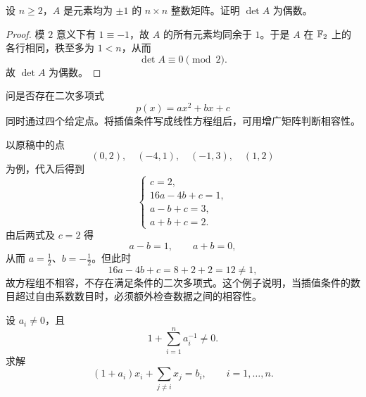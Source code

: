 \begin{exercise}
设 $n\geq2$，$A$ 是元素均为 $\pm1$ 的 $n\times n$ 整数矩阵。证明 $\det A$ 为偶数。
\end{exercise}

\begin{proof}
模 $2$ 意义下有 $1\equiv-1$，故 $A$ 的所有元素均同余于 $1$。于是 $A$ 在 $\mathbb F_2$ 上的各行相同，秩至多为 $1<n$，从而
\begin{equation}
 \det A\equiv0\pmod2.
\end{equation}
故 $\det A$ 为偶数。
\end{proof}

\begin{exercise}[插值方程的相容性]
问是否存在二次多项式
\begin{equation}
 p(x)=ax^2+bx+c
\end{equation}
同时通过四个给定点。将插值条件写成线性方程组后，可用增广矩阵判断相容性。
\end{exercise}

\begin{solution}
以原稿中的点
\begin{equation}
 (0,2),\quad (-4,1),\quad (-1,3),\quad (1,2)
\end{equation}
为例，代入后得到
\begin{equation}
\begin{cases}
 c=2,\\
 16a-4b+c=1,\\
 a-b+c=3,\\
 a+b+c=2.
\end{cases}
\end{equation}
由后两式及 $c=2$ 得
\begin{equation}
 a-b=1,
 \qquad
 a+b=0,
\end{equation}
从而 $a=\tfrac12$、$b=-\tfrac12$。但此时
\begin{equation}
 16a-4b+c=8+2+2=12\neq1,
\end{equation}
故方程组不相容，不存在满足条件的二次多项式。这个例子说明，当插值条件的数目超过自由系数数目时，必须额外检查数据之间的相容性。
\end{solution}

\begin{exercise}[一类对称耦合方程组]
设 $a_i\neq0$，且
\begin{equation}
 1+\sum_{i=1}^n a_i^{-1}\neq0.
\end{equation}
求解
\begin{equation}
 (1+a_i)x_i+\sum_{j\neq i}x_j=b_i,
 \qquad i=1,\ldots,n.
\end{equation}
\end{exercise}

